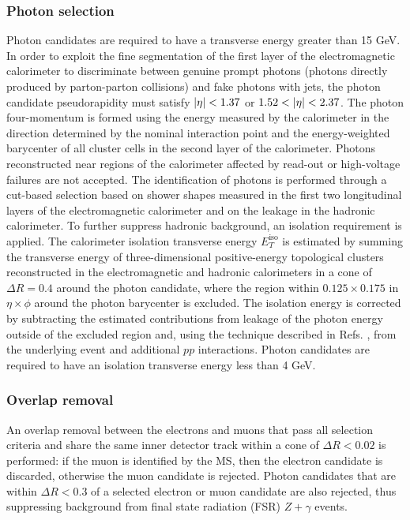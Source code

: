 \subsubsection*{Photon selection}
Photon candidates are required to have a transverse energy greater than 15 GeV.
In order to exploit the fine segmentation of the first layer of the electromagnetic
calorimeter to discriminate between genuine prompt photons (photons directly produced
by parton-parton collisions) and fake photons with jets, the photon candidate 
pseudorapidity must satisfy $\abseta < 1.37$ or $1.52 < \abseta < 2.37$. The
photon four-momentum is formed using the energy measured by the calorimeter in the
direction determined by the nominal interaction point and the energy-weighted
barycenter of all cluster cells in the second layer of the calorimeter. Photons
reconstructed near regions of the calorimeter affected by read-out or high-voltage 
failures are not accepted. The identification of photons is performed through a
cut-based selection based on shower shapes measured in the first two longitudinal
layers of the electromagnetic calorimeter and on the leakage in the hadronic
calorimeter. To further suppress hadronic background, an isolation requirement is 
applied. The calorimeter isolation transverse energy $E_{T}^{\text{iso}}$ is
estimated by summing the transverse energy of three-dimensional positive-energy
topological clusters reconstructed in the electromagnetic and hadronic 
calorimeters in a cone of $\Delta R = 0.4$ around the photon candidate,
where the region within $0.125 \times 0.175$ in $\eta \times \phi$ around the
photon barycenter is excluded. The isolation energy is corrected by subtracting
the estimated contributions from leakage of the photon energy outside of the
excluded region and, using the technique described in 
Refs. \cite{Cacciari:2008gn, Cacciari:2009dp},
from the underlying event and additional $pp$ interactions. Photon candidates
are required to have an isolation transverse energy less than 4 GeV.

\subsubsection*{Overlap removal}
An overlap removal between the electrons and muons that pass all selection
criteria and share the same inner detector track within a cone of $\Delta R < 0.02$
is performed: if the muon is identified by the MS, then the electron candidate is 
discarded, otherwise the muon candidate is rejected. Photon candidates that are
within $\Delta R < 0.3$ of a selected electron or muon candidate are also rejected,
thus suppressing background from final state radiation (FSR) $Z+\gamma$ events.

